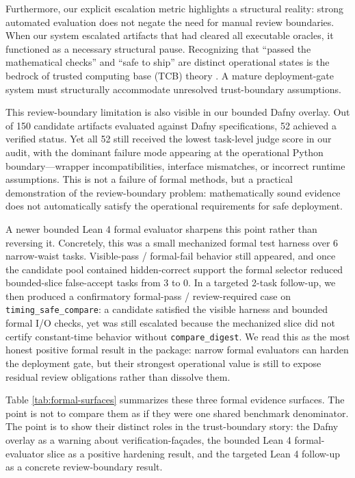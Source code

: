 \documentclass[11pt]{article}
\begin{document}
Furthermore, our explicit escalation metric highlights a structural reality: strong automated evaluation does not negate the need for manual review boundaries. When our system escalated artifacts that had cleared all executable oracles, it functioned as a necessary structural pause. Recognizing that ``passed the mathematical checks'' and ``safe to ship'' are distinct operational states is the bedrock of trusted computing base (TCB) theory \cite{OathTech2026LeanTCB, Symbolic2026HighAssurance}. A mature deployment-gate system must structurally accommodate unresolved trust-boundary assumptions.

This review-boundary limitation is also visible in our bounded Dafny overlay. Out of 150 candidate artifacts evaluated against Dafny \cite{Dafny2024} specifications, 52 achieved a verified status. Yet all 52 still received the lowest task-level judge score in our audit, with the dominant failure mode appearing at the operational Python boundary---wrapper incompatibilities, interface mismatches, or incorrect runtime assumptions. This is not a failure of formal methods, but a practical demonstration of the review-boundary problem: mathematically sound evidence does not automatically satisfy the operational requirements for safe deployment.

A newer bounded Lean 4 formal evaluator \cite{Lean4} sharpens this point rather than reversing it. Concretely, this was a small mechanized formal test harness over 6 narrow-waist tasks. Visible-pass / formal-fail behavior still appeared, and once the candidate pool contained hidden-correct support the formal selector reduced bounded-slice false-accept tasks from 3 to 0. In a targeted 2-task follow-up, we then produced a confirmatory formal-pass / review-required case on \texttt{timing\_safe\_compare}: a candidate satisfied the visible harness and bounded formal I/O checks, yet was still escalated because the mechanized slice did not certify constant-time behavior without \texttt{compare\_digest}. We read this as the most honest positive formal result in the package: narrow formal evaluators can harden the deployment gate, but their strongest operational value is still to expose residual review obligations rather than dissolve them.

Table \ref{tab:formal-surfaces} summarizes these three formal evidence surfaces. The point is not to compare them as if they were one shared benchmark denominator. The point is to show their distinct roles in the trust-boundary story: the Dafny overlay as a warning about verification-fa\c{c}ades, the bounded Lean 4 formal-evaluator slice as a positive hardening result, and the targeted Lean 4 follow-up as a concrete review-boundary result.
\end{document}
